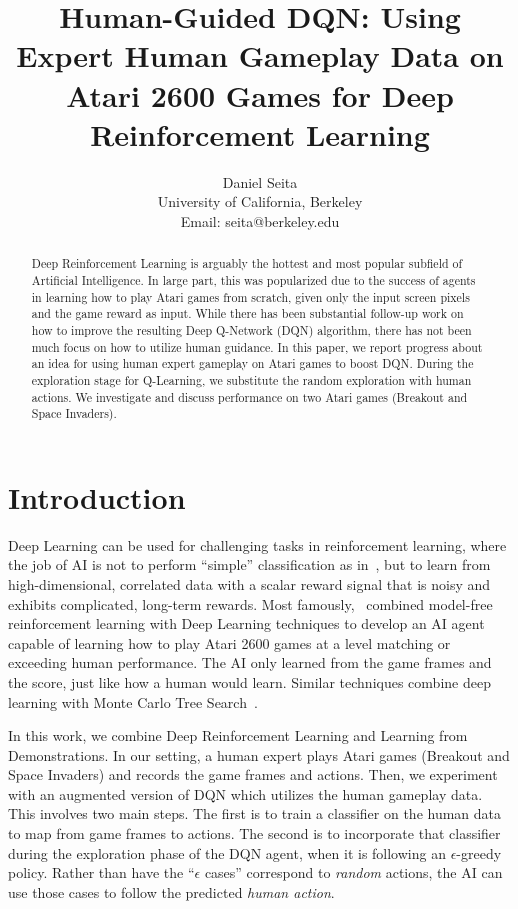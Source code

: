 \documentclass[letterpaper, 10pt, conference]{ieeeconf}
\title{\LARGE \bf Human-Guided DQN: Using Expert Human Gameplay Data on Atari
2600 Games for Deep Reinforcement Learning}
\author{Daniel Seita \\
University of California, Berkeley\\
Email: seita@berkeley.edu
}
\begin{document}
\maketitle

\begin{abstract}
Deep Reinforcement Learning is arguably the hottest and most popular subfield of
Artificial Intelligence. In large part, this was popularized due to the success
of agents in learning how to play Atari games from scratch, given only the input
screen pixels and the game reward as input.  While there has been substantial
follow-up work on how to improve the resulting Deep Q-Network (DQN) algorithm,
there has not been much focus on how to utilize human guidance. In this paper,
we report progress about an idea for using human expert gameplay on Atari games
to boost DQN. During the exploration stage for Q-Learning, we substitute the
random exploration with human actions. We investigate and discuss performance on
two Atari games (Breakout and Space Invaders).
\end{abstract}

\section{Introduction}\label{sec:introduction}

Deep Learning can be used for challenging tasks in reinforcement learning, where
the job of AI is not to perform ``simple'' classification as
in~\cite{AlexNet2012}, but to learn from high-dimensional, correlated data with
a scalar reward signal that is noisy and exhibits complicated, long-term
rewards. Most famously,~\cite{mnih-dqn-2015} combined model-free reinforcement
learning with Deep Learning techniques to develop an AI agent capable of
learning how to play Atari 2600 games at a level matching or exceeding human
performance. The AI only learned from the game frames and the score, just like
how a human would learn. Similar techniques combine deep learning with Monte
Carlo Tree Search~\cite{nips-atari-2014,silver-alphago-2016}.

In this work, we combine Deep Reinforcement Learning and Learning from
Demonstrations. In our setting, a human expert plays Atari games (Breakout and
Space Invaders) and records the game frames and actions.  Then, we experiment
with an augmented version of DQN which utilizes the human gameplay data. This
involves two main steps. The first is to train a classifier on the human data to
map from game frames to actions. The second is to incorporate that classifier
during the exploration phase of the DQN agent, when it is following an
$\epsilon$-greedy policy. Rather than have the ``$\epsilon$ cases'' correspond
to \emph{random} actions, the AI can use those cases to follow the predicted
\emph{human action}.
\end{document}
